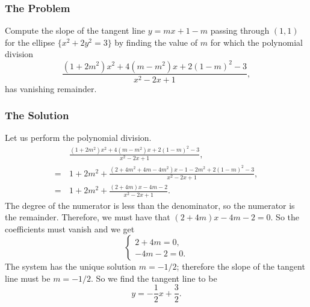 \subsubsection*{The Problem}

Compute the slope of the tangent line \(y = mx + 1 -m\) passing through \((1,1)\) for the ellipse 
\(\{x^2 + 2y^2 = 3\}\) by finding the value of \(m\) for which the polynomial division
\begin{equation}
\frac{(1 + 2m^2)x^2 + 4(m - m^2)x + 2(1 - m)^2 - 3}{x^2 - 2x + 1},
\end{equation}
has vanishing remainder.

\subsubsection*{The Solution}

Let us perform the polynomial division.
\begin{align}
& \frac{(1 + 2m^2)x^2 + 4(m - m^2)x + 2(1 - m)^2 - 3}{x^2 - 2x + 1}, \\
= \, & 1 + 2m^2 + \frac{(2 + 4m^2 + 4m - 4m^2)x - 1 - 2m^2 + 2(1 - m)^2 - 3}{x^2 - 2x + 1}, \\ 
= \, & 1 + 2m^2 + \frac{(2 + 4m)x - 4m - 2 }{x^2 - 2x + 1}.
\end{align}
The degree of the numerator is less than the denominator, so the numerator is the remainder. Therefore,
we must have that \((2 + 4m)x - 4m - 2 = 0\). So the coefficients must vanish and we get
\begin{equation}
\begin{cases}
2 + 4m = 0, \\
-4m - 2 = 0.
\end{cases}
\end{equation}
The system has the unique solution \(m = -1/2\); therefore the slope of the tangent line must be \(m = -1/2\).
So we find the tangent line to be
\begin{equation}
y = -\frac{1}{2}x + \frac{3}{2}.
\end{equation}
